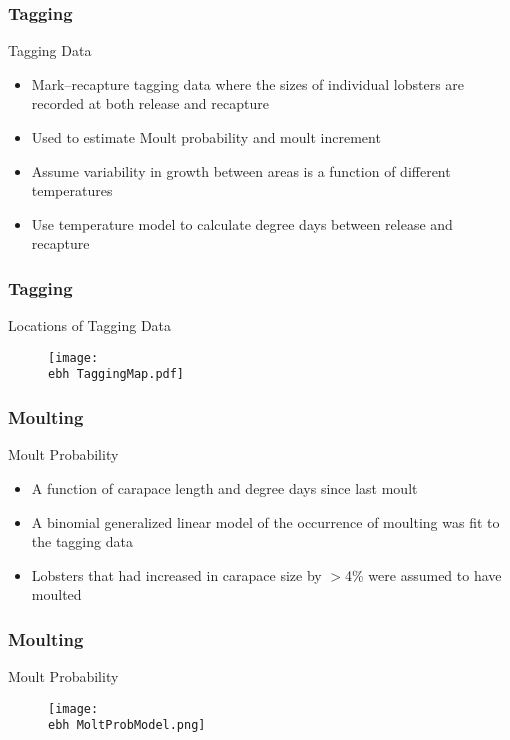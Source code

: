 \documentclass{beamer}
\newcommand{\ebh}{\string~/bio.data/bio.lobster/figures/LFA3438Framework2019/} %
\begin{document}
\begin{frame}
\frametitle{Tagging}
Tagging Data
\begin{itemize}
\item Mark–recapture tagging data where the sizes of individual lobsters are recorded at both release and recapture
\item Used to estimate Moult probability and moult increment
\item Assume variability in growth between areas is a function of different temperatures
\item Use temperature model to calculate degree days between release and recapture
\end{itemize}
\end{frame}


\begin{frame}
\frametitle{Tagging}
Locations of Tagging Data
\begin{figure}
        \begin{center}
            \texttt{[image: \\ebh TaggingMap.pdf]}
        \end{center}
    \end{figure}
\end{frame}



\begin{frame}
\frametitle{Moulting}
Moult Probability 
\begin{itemize}
\item A function of carapace length and degree days since last moult
\item A binomial generalized linear model of the occurrence of moulting was fit to the tagging data
\item Lobsters that had increased in carapace size by $>$4\% were assumed to have moulted
\end{itemize}
\end{frame}



\begin{frame}
\frametitle{Moulting}
Moult Probability 
\begin{figure}
        \begin{center}
            \texttt{[image: \\ebh MoltProbModel.png]}
        \end{center}
    \end{figure}
\end{frame}
\end{document}
